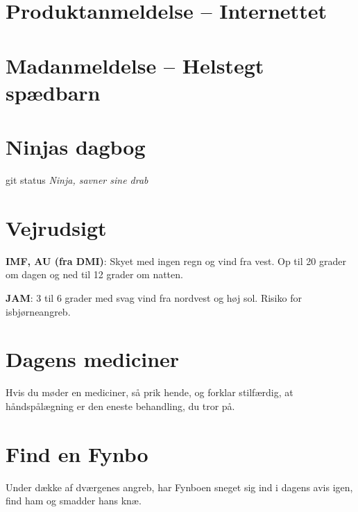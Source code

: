 

\begin{minipage}[b]{0.95\linewidth}
\begin{minipage}[t]{0.47\textwidth}
\vspace{3mm}
\section*{Produktanmeldelse -- Internettet}


\vspace{1mm}
\section*{Madanmeldelse -- Helstegt spædbarn}
\vspace{2mm}

\section*{Ninjas dagbog}
git status
{\flushright\emph{Ninja, savner sine drab}}

\end{minipage}%
\hfill\begin{minipage}[t]{0.47\textwidth}
\vspace{3mm}
\section*{Vejrudsigt}
\textbf{IMF, AU (fra DMI)}: Skyet med ingen regn og vind fra vest. Op til 20 grader om dagen og ned til 12 grader om natten.

\textbf{JAM}: 3 til 6 grader med svag vind fra nordvest og høj sol. Risiko for isbjørneangreb.

\vspace{-2mm}
\section*{Dagens mediciner}
Hvis du møder en mediciner, så prik hende, og forklar stilfærdig, at håndspålægning er den eneste behandling, du tror på.

\vspace{-2mm}
\section*{Find en Fynbo}
Under dække af dværgenes angreb, har Fynboen sneget sig ind i dagens avis igen, find ham og smadder hans knæ.


\end{minipage}
\end{minipage}
